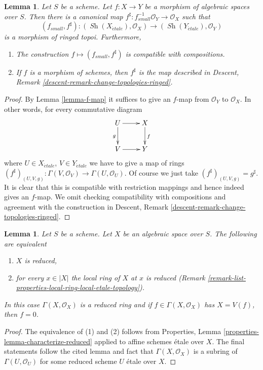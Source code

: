 \documentclass{stacks-project}
\theoremstyle{plain}
\newtheorem{lemma}[subsection]{Lemma}
\theoremstyle{definition}
\theoremstyle{remark}
\numberwithin{equation}{subsection}
\def\Sh{\mathop{\mathit{Sh}}\nolimits}
\def\etale{{\acute{e}tale}}
\begin{document}
\begin{lemma}
\label{lemma-morphism-ringed-topoi}
Let $S$ be a scheme.
Let $f : X \to Y$ be a morphism of algebraic spaces over $S$.
Then there is a canonical map
$f^\sharp : f_{small}^{-1}\mathcal{O}_Y \to \mathcal{O}_X$ such that
$$
(f_{small}, f^\sharp) :
(\Sh(X_\etale), \mathcal{O}_X)
\longrightarrow
(\Sh(Y_\etale), \mathcal{O}_Y)
$$
is a morphism of ringed topoi. Furthermore,
\begin{enumerate}
\item The construction $f \mapsto (f_{small}, f^\sharp)$ is compatible with
compositions.
\item If $f$ is a morphism of schemes, then $f^\sharp$ is the map described in
Descent, Remark \ref{descent-remark-change-topologies-ringed}.
\end{enumerate}
\end{lemma}

\begin{proof}
By Lemma \ref{lemma-f-map} it suffices to give an $f$-map from
$\mathcal{O}_Y$ to $\mathcal{O}_X$. In other words, for every
commutative diagram
$$
\xymatrix{
U \ar[d]_g \ar[r] & X \ar[d]^f \\
V \ar[r] & Y
}
$$
where $U \in X_\etale$, $V \in Y_\etale$ we have to give a
map of rings
$
(f^\sharp)_{(U, V, g)} :
\Gamma(V, \mathcal{O}_V)
\to
\Gamma(U, \mathcal{O}_U).
$
Of course we just take $(f^\sharp)_{(U, V, g)} = g^\sharp$.
It is clear that this is compatible with restriction mappings
and hence indeed gives an $f$-map.
We omit checking compatibility with compositions and agreement with the
construction in
Descent, Remark \ref{descent-remark-change-topologies-ringed}.
\end{proof}

\begin{lemma}
\label{lemma-reduced-space}
Let $S$ be a scheme. Let $X$ be an algebraic space over $S$.
The following are equivalent
\begin{enumerate}
\item $X$ is reduced,
\item for every $x \in |X|$ the local ring of $X$ at $x$ is
reduced (Remark \ref{remark-list-properties-local-ring-local-etale-topology}).
\end{enumerate}
In this case $\Gamma(X, \mathcal{O}_X)$ is a reduced ring and
if $f \in \Gamma(X, \mathcal{O}_X)$ has $X = V(f)$, then $f = 0$.
\end{lemma}

\begin{proof}
The equivalence of (1) and (2) follows from
Properties, Lemma \ref{properties-lemma-characterize-reduced}
applied to affine schemes \'etale over $X$. The final statements
follow the cited lemma and fact that $\Gamma(X, \mathcal{O}_X)$ is
a subring of $\Gamma(U, \mathcal{O}_U)$ for some
reduced scheme $U$ \'etale over $X$.
\end{proof}
\end{document}
